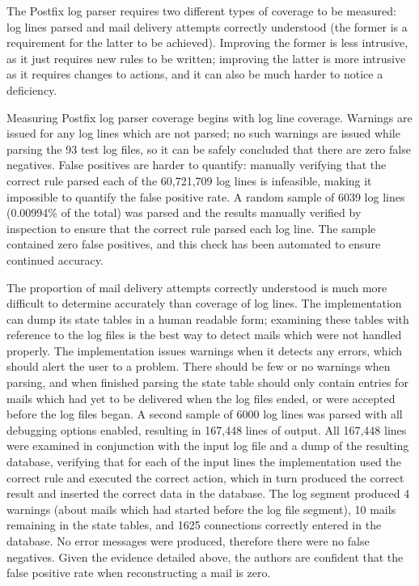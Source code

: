\documentclass[draft]{svmult}
\newcommand{\numberOFlogFILES}[0]{%
    93%
}
\newcommand{\numberOFlogLINES}[0]{%
    60,721,709%
}
\begin{document}
\label{coverage}

The Postfix log parser requires two different types of coverage to be
measured: log lines parsed and mail delivery attempts correctly understood
(the former is a requirement for the latter to be achieved).  Improving the
former is less intrusive, as it just requires new rules to be written;
improving the latter is more intrusive as it requires changes to actions,
and it can also be much harder to notice a deficiency.

Measuring Postfix log parser coverage begins with log line coverage.
Warnings are issued for any log lines which are not parsed; no such
warnings are issued while parsing the \numberOFlogFILES{} test log files,
so it can be safely concluded that there are zero false negatives.  False
positives are harder to quantify: manually verifying that the correct rule
parsed each of the \numberOFlogLINES{} log lines is infeasible, making it
impossible to quantify the false positive rate.  A random sample of 6039
log lines (0.00994\% of the total) was parsed and the results manually
verified by inspection to ensure that the correct rule parsed each log
line.  The sample contained zero false positives, and this check has been
automated to ensure continued accuracy.

The proportion of mail delivery attempts correctly understood is much more
difficult to determine accurately than coverage of log lines.  The
implementation can dump its state tables in a human readable form;
examining these tables with reference to the log files is the best way to
detect mails which were not handled properly.  The implementation issues
warnings when it detects any errors, which should alert the user to a
problem.  There should be few or no warnings when parsing, and when
finished parsing the state table should only contain entries for mails
which had yet to be delivered when the log files ended, or were accepted
before the log files began.  A second sample of 6000 log lines was parsed
with all debugging options enabled, resulting in 167,448 lines of output.
All 167,448 lines were examined in conjunction with the input log file and
a dump of the resulting database, verifying that for each of the input
lines the implementation used the correct rule and executed the correct
action, which in turn produced the correct result and inserted the correct
data in the database.  The log segment produced 4 warnings (about mails
which had started before the log file segment), 10 mails remaining in the
state tables, and 1625 connections correctly entered in the database.  No
error messages were produced, therefore there were no false negatives.
Given the evidence detailed above, the authors are confident that the false
positive rate when reconstructing a mail is zero.
\end{document}
